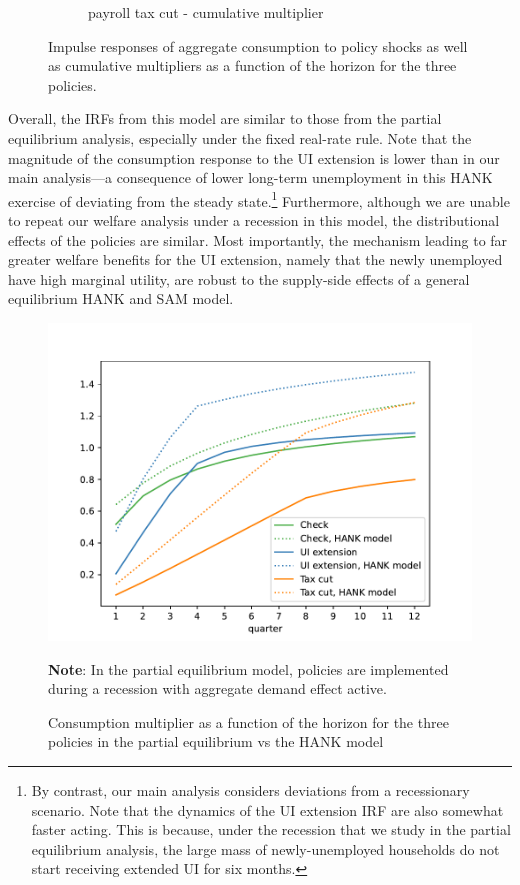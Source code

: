 \begin{figure}[htb]
\begin{subfigure}[b]{.33\linewidth}
		\caption{payroll tax cut - cumulative multiplier}
		\label{fig:HANK_tax_multiplier}
	\end{subfigure}
	\caption{Impulse responses of aggregate consumption to policy shocks as well as cumulative multipliers as a function of the horizon for the three policies. {\label{fig:HANK_IRFs}}}
\end{figure}



Overall, the IRFs from this model are similar to those from the partial equilibrium analysis, especially under the fixed real-rate rule. Note that the magnitude of the consumption response to the UI extension is lower than in our main analysis---a consequence of lower long-term unemployment in this HANK exercise of deviating from the steady state.\footnote{By contrast, our main analysis considers deviations from a recessionary scenario. Note that the dynamics of the UI extension IRF are also somewhat faster acting.
This is because, under the recession that we study in the partial equilibrium analysis, the large mass of newly-unemployed households do not start receiving extended UI for six months.
} Furthermore, although we are unable to repeat our welfare analysis under a recession in this model, the distributional effects of the policies are similar.
Most importantly, the mechanism leading to far greater welfare benefits for the UI extension, namely that the newly unemployed have high marginal utility, are robust to the supply-side effects of a general equilibrium HANK and SAM model.

\begin{figure}[th]
	\begin{center}
		\includegraphics[width=.9\textwidth]{text/chapter3/Code/HA-Models/FromPandemicCode/Figures/Cummulative_multipliers_withHank}
		\caption{Consumption multiplier as a function of the horizon for the three policies in the partial equilibrium vs the HANK model}
		\parbox{16cm}{\small \vspace{.15cm} \textbf{Note}: In the partial equilibrium model, policies are implemented during a recession with aggregate demand effect active.\normalsize}
		\label{fig:HANK_multipliers}
	\end{center}
\end{figure}


